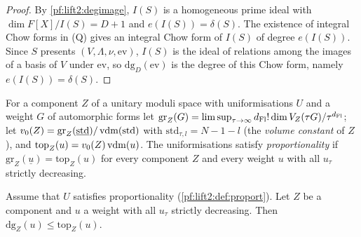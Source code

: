 \begin{proof}
By \cref{pf:lift2:degimage}, $I(S)$ is a homogeneous prime ideal with $\dim F[X]/I(S)=D+1$ and $e(I(S))=\delta(S)$. The
existence of integral Chow forms in \textup{(Q)} gives an integral Chow form of $I(S)$ of degree $e(I(S))$. Since $S$
presents $(V,\Lambda,\nu,\mathrm{ev})$, $I(S)$ is the ideal of relations among the images of a basis of $V$ under
$\mathrm{ev}$, so $\mathrm{dg}_D(\mathrm{ev})$ is the degree of this Chow form, namely $e(I(S))=\delta(S)$.
\end{proof}

\begin{definition}\label{pf:lift2:def:proport}
For a component $Z$ of a unitary moduli space with uniformisations $U$ and a weight $G$ of automorphic forms let
$\mathrm{gr}_Z(G)=\limsup_{\tau\to\infty}d_{\mathrm{Fl}}!\dim V_Z(\tau G)/\tau^{d_{\mathrm{Fl}}}$; let
$v_0(Z)=\mathrm{gr}_Z(\underline{\mathrm{std}})/\operatorname{vdm}(\mathrm{std})$ with $\mathrm{std}_{\tau,l}=N-1-l$ (the
\emph{volume constant} of $Z$), and $\mathrm{top}_Z(u)=v_0(Z)\operatorname{vdm}(u)$. The uniformisations satisfy
\emph{proportionality} if $\mathrm{gr}_Z(\underline u)=\mathrm{top}_Z(u)$ for every component $Z$ and every weight $u$
with all $u_\tau$ strictly decreasing.
\end{definition}

\begin{proposition}\label{pf:lift2:compdeg}
Assume that $U$ satisfies proportionality (\cref{pf:lift2:def:proport}). Let $Z$ be a component and $u$ a weight with all $u_\tau$ strictly
decreasing. Then $\mathrm{dg}_Z(u)\le\mathrm{top}_Z(u)$.
\end{proposition}

